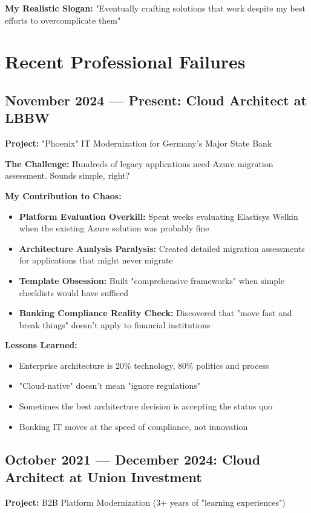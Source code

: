 \documentclass[10pt,a4paper]{article}
\begin{document}
\textbf{My Realistic Slogan:} "Eventually crafting solutions that work despite my best efforts to overcomplicate them"

\section{Recent Professional Failures}

\subsection{November 2024 — Present: Cloud Architect at LBBW}
\textbf{Project:} "Phoenix" IT Modernization for Germany's Major State Bank

\textbf{The Challenge:} Hundreds of legacy applications need Azure migration assessment. Sounds simple, right?

\textbf{My Contribution to Chaos:}
\begin{itemize}[leftmargin=10pt,itemsep=1pt]
\item \textbf{Platform Evaluation Overkill:} Spent weeks evaluating Elastisys Welkin when the existing Azure solution was probably fine
\item \textbf{Architecture Analysis Paralysis:} Created detailed migration assessments for applications that might never migrate
\item \textbf{Template Obsession:} Built "comprehensive frameworks" when simple checklists would have sufficed
\item \textbf{Banking Compliance Reality Check:} Discovered that "move fast and break things" doesn't apply to financial institutions
\end{itemize}

\textbf{Lessons Learned:}
\begin{itemize}[leftmargin=10pt,itemsep=1pt]
\item Enterprise architecture is 20\% technology, 80\% politics and process
\item "Cloud-native" doesn't mean "ignore regulations"
\item Sometimes the best architecture decision is accepting the status quo
\item Banking IT moves at the speed of compliance, not innovation
\end{itemize}

\subsection{October 2021 — December 2024: Cloud Architect at Union Investment}
\textbf{Project:} B2B Platform Modernization (3+ years of "learning experiences")
\end{document}
